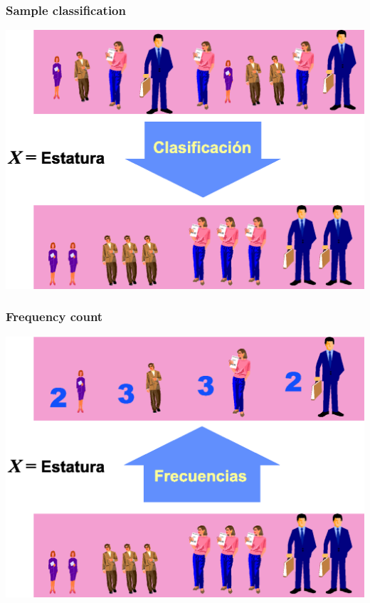 \begin{frame}
\frametitle{Sample classification}
\begin{center}
\includegraphics[scale=0.5]{img/descriptive/clasificacion_muestra}
\end{center}
\end{frame}


\begin{frame}
\frametitle{Frequency count}
\begin{center}
\includegraphics[scale=0.5]{img/descriptive/recuento_frecuencias}
\end{center}
\end{frame}


